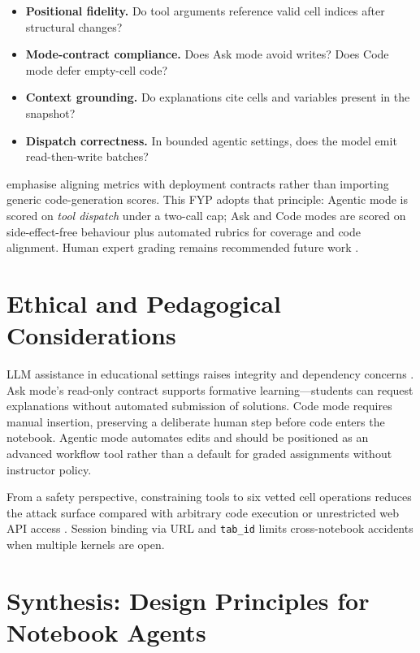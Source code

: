 \begin{itemize}
  \item \textbf{Positional fidelity.} Do tool arguments reference valid cell indices after structural changes?
  \item \textbf{Mode-contract compliance.} Does Ask mode avoid writes? Does Code mode defer empty-cell code?
  \item \textbf{Context grounding.} Do explanations cite cells and variables present in the snapshot?
  \item \textbf{Dispatch correctness.} In bounded agentic settings, does the model emit read-then-write batches?
\end{itemize}

\textcite{hou2024llm4se} emphasise aligning metrics with deployment contracts rather than importing generic code-generation scores. This FYP adopts that principle: Agentic mode is scored on \emph{tool dispatch} under a two-call cap; Ask and Code modes are scored on side-effect-free behaviour plus automated rubrics for coverage and code alignment. Human expert grading remains recommended future work \parencite{wang2021welldocumented,chen2021codex}.

\section{Ethical and Pedagogical Considerations}
\label{sec:lit-ethics}

LLM assistance in educational settings raises integrity and dependency concerns \parencite{finnieansley2022codex}. Ask mode's read-only contract supports formative learning---students can request explanations without automated submission of solutions. Code mode requires manual insertion, preserving a deliberate human step before code enters the notebook. Agentic mode automates edits and should be positioned as an advanced workflow tool rather than a default for graded assignments without instructor policy.

From a safety perspective, constraining tools to six vetted cell operations reduces the attack surface compared with arbitrary code execution or unrestricted web API access \parencite{patil2023gorilla,schick2023toolformer}. Session binding via URL and \texttt{tab\_id} limits cross-notebook accidents when multiple kernels are open.

\section{Synthesis: Design Principles for Notebook Agents}
\label{sec:lit-synthesis}


